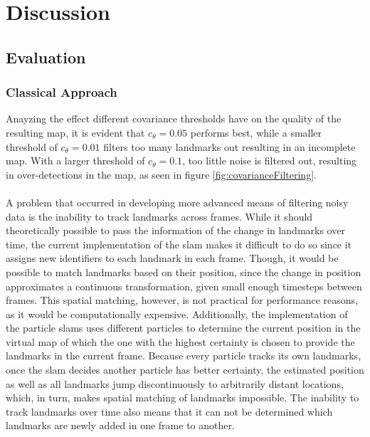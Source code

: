 \graphicspath{{Chapter/Figs/evaluation/}}
\chapter{Discussion}

\section{Evaluation}
\subsection{Classical Approach}
$ $\\Anayzing the effect different covariance thresholds have on the quality of the resulting map, it is evident that $c_\theta=0.05$ performs best, while a smaller threshold of $c_\theta=0.01$ filters too many landmarks out resulting in an incomplete map. With a larger threshold of $c_\theta=0.1$, too little noise is filtered out, resulting in over-detections in the map, as seen in figure \ref{fig:covarianceFiltering}.\\
\\
A problem that occurred in developing more advanced means of filtering noisy data is the inability to track landmarks across frames. While it should theoretically possible to pass the information of the change in landmarks over time, the current implementation of the \ac{slam} makes it difficult to do so since it assigns new identifiers to each landmark in each frame. Though, it would be possible to match landmarks based on their position, since the change in position approximates a continuous transformation, given small enough timesteps between frames. This spatial matching, however, is not practical for performance reasons, as it would be computationally expensive. Additionally, the implementation of the particle \ac{slam}s uses different particles to determine the current position in the virtual map of which the one with the highest certainty is chosen to provide the landmarks in the current frame. Because every particle tracks its own landmarks, once the \ac{slam} decides another particle has better certainty, the estimated position as well as all landmarks jump discontinuously to arbitrarily distant locations, which, in turn, makes spatial matching of landmarks impossible. The inability to track landmarks over time also means that it can not be determined which landmarks are newly added in one frame to another.

